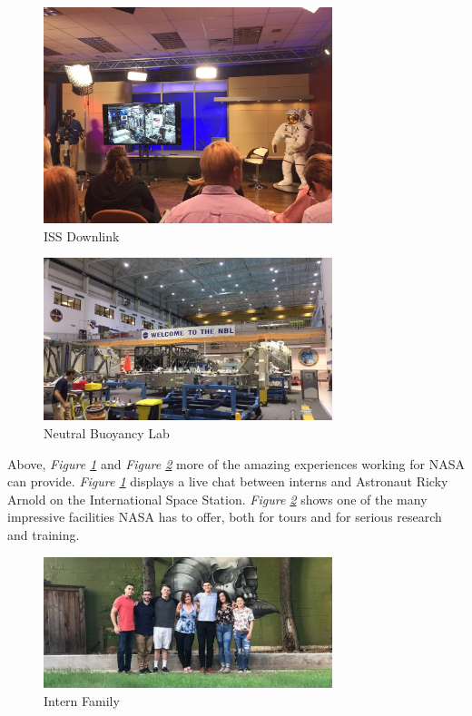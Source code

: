 \documentclass{article}
\begin{document}
\begin{figure}[!htb]
  \centering
  \includegraphics[width=0.75\textwidth]{assets/videodemonstration.png}
  \caption{ISS Downlink}
  \label{fig:videodemonstration}
\end{figure}

\begin{figure}[!htb]
  \centering
  \includegraphics[width=0.75\textwidth]{assets/welcometonbl.png}
  \caption{Neutral Buoyancy Lab}
  \label{fig:welcometonbl}
\end{figure}

Above, \textit{Figure \ref{fig:videodemonstration}} and \textit{Figure \ref{fig:welcometonbl}} more of the amazing experiences working for NASA can provide. \textit{Figure \ref{fig:videodemonstration}} displays a live chat between interns and Astronaut Ricky Arnold on the International Space Station. \textit{Figure \ref{fig:welcometonbl}} shows one of the many impressive facilities NASA has to offer, both for tours and for serious research and training.

\begin{figure}[!htb]
  \centering
  \includegraphics[width=0.75\textwidth]{assets/ronniewithfriends.png}
  \caption{Intern Family}
  \label{fig:ronniewithfriends}
\end{figure}
\end{document}

